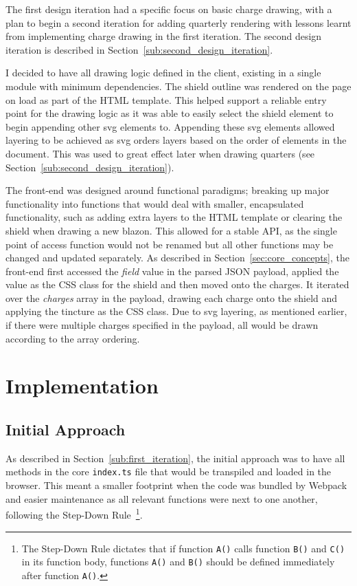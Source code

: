 \documentclass[nobib, a4paper, twoside, justified]{tufte-book}
\makeatletter
\newcommand{\svg}{\gls{svg}\@\xspace}
\newcommand{\charge}{\gls{charge}\@\xspace}
\newcommand{\charges}{\glspl{charge}\@\xspace}
\makeatother
\begin{document}
The first design iteration had a specific focus on basic \charge{} drawing, with a plan to begin a
second iteration for adding quarterly rendering with lessons learnt from implementing \charge{}
drawing in the first iteration. The second design iteration is described in
Section~\ref{sub:second_design_iteration}.

I decided to have all drawing logic defined in the client, existing in a single module with minimum
dependencies. The shield outline was rendered on the page on load as part of the HTML template.
This helped support a reliable entry point for the drawing logic as it was able to easily select
the shield element to begin appending other \svg{} elements to. Appending these \svg{} elements
allowed layering to be achieved as \svg{} orders layers based on the order of elements in the
document. This was used to great effect later when drawing quarters (see
Section~\ref{sub:second_design_iteration}).

The front-end was designed around functional paradigms; breaking up major functionality into
functions that would deal with smaller, encapsulated functionality, such as adding extra layers to
the HTML template or clearing the shield when drawing a new blazon. This allowed for a stable API,
as the single point of access function would not be renamed but all other functions may be changed
and updated separately. As described in Section~\ref{sec:core_concepts}, the front-end first
accessed the \textit{field} value in the parsed JSON payload, applied the value as the CSS class
for the shield and then moved onto the \charges{}. It iterated over the \textit{\charges{}} array
in the payload, drawing each \charge{} onto the shield and applying the tincture as the CSS class.
Due to \svg{} layering, as mentioned earlier, if there were multiple \charges{} specified in the
payload, all would be drawn according to the array ordering.

\chapter{Implementation}%
\label{cha:implementation}

\section{Initial Approach}%
\label{sec:initial_approach}

As described in Section~\ref{sub:first_iteration}, the initial approach was to have all methods in
the core \texttt{index.ts} file that would be \gls{transpile}d and loaded in the browser. This
meant a smaller footprint when the code was bundled by Webpack and easier maintenance as all
relevant functions were next to one another, following the Step-Down
Rule~\autocite{martin2009clean}\footnote{The Step-Down Rule dictates that if function \texttt{A()}
calls function \texttt{B()} and \texttt{C()} in its function body, functions \texttt{A()} and
\texttt{B()} should be defined immediately after function \texttt{A()}.}.
\end{document}
